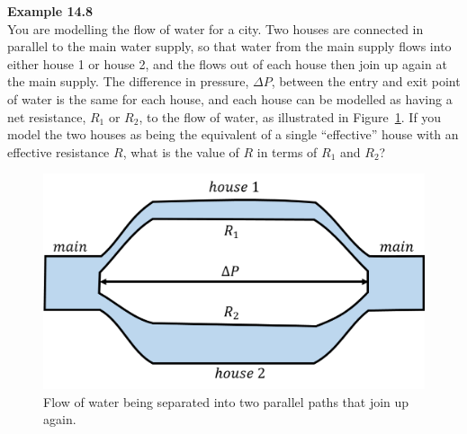 \begin{framed}
\textbf{Example 14.8}\\
You are modelling the flow of water for a city. Two houses are connected in parallel to the main water supply, so that water from the main supply flows into either house 1 or house 2, and the flows out of each house then join up again at the main supply. The difference in pressure, $\Delta P$, between the entry and exit point of water is the same for each house, and each house can be modelled as having a net resistance, $R_{1}$ or $R_2$, to the flow of water, as illustrated in Figure~\ref{fig:fluidmechanics:parallel}. If you model the two houses as being the equivalent of a single ``effective'' house with an effective resistance $R$, what is the value of $R$ in terms of $R_1$ and $R_2$?

\begin{figure}[!htbp]
\centering
\includegraphics[width=0.7\linewidth]{files/parallel-14e52be1566a62440fcddbe9b5020f5a.png}
\caption[]{Flow of water being separated into two parallel paths that join up again.}
\label{fig:fluidmechanics:parallel}
\end{figure}


\end{framed}
